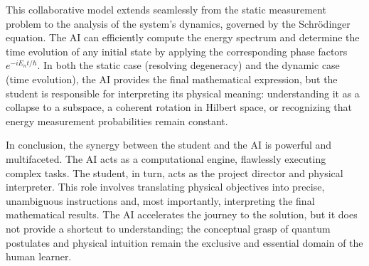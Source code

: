 \documentclass[11pt,a4paper]{article}
\begin{document}
  This collaborative model extends seamlessly from the static measurement
  problem to the analysis of the system's dynamics, governed by the
  Schrödinger equation. The AI can efficiently compute the energy
  spectrum and determine the time evolution of any initial state by applying the
  corresponding phase factors $e^{-iE_nt/\hbar}$. In both the static case
  (resolving degeneracy) and the dynamic case (time evolution), the AI provides
  the final mathematical expression, but the student is responsible for
  interpreting its physical meaning: understanding it as a collapse to a
  subspace, a coherent rotation in Hilbert space, or recognizing that energy
  measurement probabilities remain constant.

  In conclusion, the synergy between the student and the AI is powerful and
  multifaceted. The AI acts as a computational engine, flawlessly executing
  complex tasks. The student, in turn, acts as the project director and
  physical interpreter. This role involves translating physical objectives into
  precise, unambiguous instructions and, most importantly, interpreting the
  final mathematical results. The AI accelerates the journey to the solution,
  but it does not provide a shortcut to understanding; the conceptual grasp of
  quantum postulates and physical intuition remain the exclusive and essential
  domain of the human learner.

  
\end{document}
